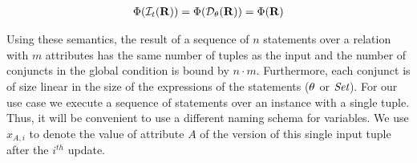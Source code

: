 \begin{defi}
\begin{align*}
  \end{align*}\\[-9mm]
  \begin{align*}
        \Phi(\mathcal{I}_{t}(\mathbf{R})) = \Phi(\mathcal{D}_{\theta}(\mathbf{R})) = \Phi(\mathbf{R})
  \end{align*}
\end{defi}


%

%

%

%
%
Using these semantics, the result of a sequence of $n$ statements over a relation with $m$ attributes has the same number of tuples as the input and the number of conjuncts in the global condition is bound by $n \cdot m$. Furthermore,
each conjunct is of size linear in the size of the expressions of the statements ($\theta$ or $\textit{Set}$).
 For our use case we execute a sequence of statements over an instance with a single tuple. Thus, it will be convenient to use a different naming schema for variables. We use $x_{A,i}$ to denote the value of attribute $A$ of the version of this single input tuple after the $i^{th}$ update.


